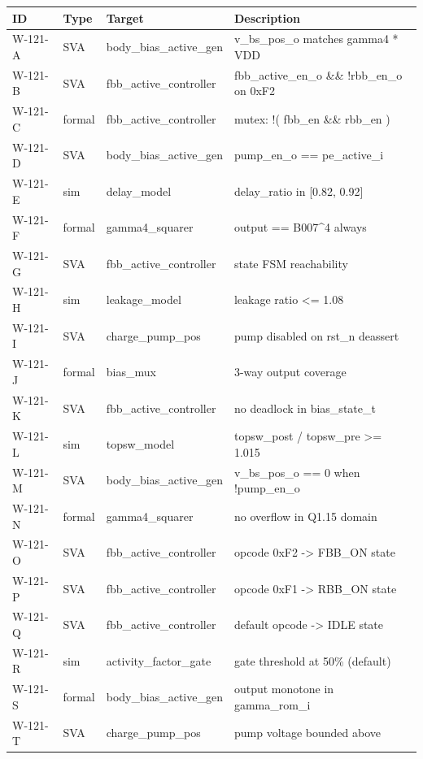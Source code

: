 \documentclass[12pt,a4paper]{report}
\theoremstyle{plain}
\theoremstyle{definition}
\theoremstyle{remark}
\begin{document}
\begin{longtable}{lllp{7cm}}
\toprule
ID & Type & Target & Description \\
\midrule
\endhead
W-121-A  & SVA    & body\_bias\_active\_gen    & v\_bs\_pos\_o matches gamma4 * VDD \\
W-121-B  & SVA    & fbb\_active\_controller    & fbb\_active\_en\_o \&\& !rbb\_en\_o on 0xF2 \\
W-121-C  & formal & fbb\_active\_controller    & mutex: !( fbb\_en \&\& rbb\_en ) \\
W-121-D  & SVA    & body\_bias\_active\_gen    & pump\_en\_o == pe\_active\_i \\
W-121-E  & sim    & delay\_model               & delay\_ratio in [0.82, 0.92] \\
W-121-F  & formal & gamma4\_squarer            & output == B007\^{}4 always \\
W-121-G  & SVA    & fbb\_active\_controller    & state FSM reachability \\
W-121-H  & sim    & leakage\_model             & leakage ratio <= 1.08 \\
W-121-I  & SVA    & charge\_pump\_pos          & pump disabled on rst\_n deassert \\
W-121-J  & formal & bias\_mux                  & 3-way output coverage \\
W-121-K  & SVA    & fbb\_active\_controller    & no deadlock in bias\_state\_t \\
W-121-L  & sim    & topsw\_model               & topsw\_post / topsw\_pre >= 1.015 \\
W-121-M  & SVA    & body\_bias\_active\_gen    & v\_bs\_pos\_o == 0 when !pump\_en\_o \\
W-121-N  & formal & gamma4\_squarer            & no overflow in Q1.15 domain \\
W-121-O  & SVA    & fbb\_active\_controller    & opcode 0xF2 -> FBB\_ON state \\
W-121-P  & SVA    & fbb\_active\_controller    & opcode 0xF1 -> RBB\_ON state \\
W-121-Q  & SVA    & fbb\_active\_controller    & default opcode -> IDLE state \\
W-121-R  & sim    & activity\_factor\_gate     & gate threshold at 50\% (default) \\
W-121-S  & formal & body\_bias\_active\_gen    & output monotone in gamma\_rom\_i \\
W-121-T  & SVA    & charge\_pump\_pos          & pump voltage bounded above \\

\end{longtable}
\end{document}
